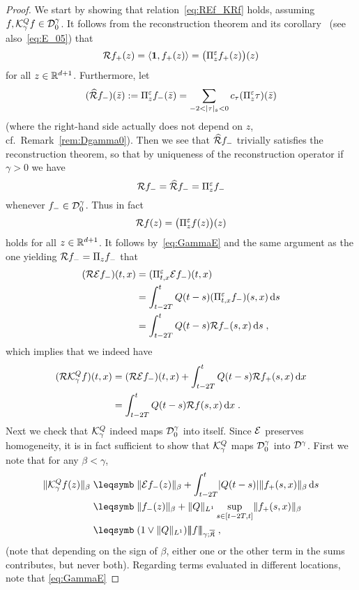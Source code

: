 \documentclass[reqno,11pt]{article}
\def\unit{\vone}
\def\normDgamma#1{|\!|\!|#1|\!|\!|}
\def\fraKbar{\overline{\mathfrak{K}}}
\def\abss#1{\abs{#1}_\mathfrak{s}}
\begin{document}
\begin{proof}
We start by showing that relation~\eqref{eq:REf_KRf} holds, assuming $f,
{\mathcal K}^Q_\gamma f\in{\mathcal D}^\gamma_0$. It follows from the reconstruction theorem and
its
corollary~\cite[Prop.~3.28]{Hairer2014} (see also~\eqref{eq:E_05}) that
\[
 \cR f_+(z) = \pscal{\unit}{f_+(z)} = \bigpar{\Pi^\eps_z f_+(z)}(z)
\]
for all $z\in\mathbb{R}^{d+1}$. Furthermore, let 
\[
 (\widehat\cR f_-)(\bar z) := \Pi^\eps_z f_-(\bar z) 
 =\sum_{-2<\abss{\tau}<0} c_\tau (\Pi^\eps_z\tau)(\bar z)
\]
(where the right-hand side actually does not depend on $z$, cf.\
Remark~\ref{rem:Dgamma0}). Then we see that $\widehat{{\mathcal R}} f_-$ trivially
satisfies the reconstruction theorem, so that by uniqueness of the
reconstruction operator if $\gamma>0$ we have 
\[
 {\mathcal R} f_- = \widehat{{\mathcal R}} f_- = \Pi^\varepsilon_z f_-
\]
whenever $f_-\in{\mathcal D}^\gamma_0$. Thus in fact 
\[
{\mathcal R} f(z) = \bigl(\Pi^\varepsilon_z f(z)\bigr)(z) 
\]
holds for all $z\in\mathbb{R}^{d+1}$. It follows by~\eqref{eq:GammaE} and the same
argument as the one yielding  ${\mathcal R} f_- = \Pi_z f_-$ that 
\begin{align*}
({\mathcal R}{\mathcal E} f_-)(t,x) 
&= (\Pi^\varepsilon_{t,x}{\mathcal E} f_-)(t,x) \\
&= \int_{t-2T}^t Q(t-s) (\Pi^\varepsilon_{t,x}f_-)(s,x)\operatorname{d}\!s \\
&= \int_{t-2T}^t Q(t-s) {\mathcal R} f_-(s,x)\operatorname{d}\!s\;,
\end{align*}
which implies that we indeed have  
\begin{align*}
 ({\mathcal R}{\mathcal K}^Q_\gamma f)(t,x) 
 &= ({\mathcal R}{\mathcal E} f_-)(t,x) + \int_{t-2T}^t Q(t-s){\mathcal R} f_+(s,x)\operatorname{d}\!x \\
 &= \int_{t-2T}^t Q(t-s){\mathcal R} f(s,x)\operatorname{d}\!x\;.
\end{align*}
Next we check that ${\mathcal K}^Q_\gamma$ indeed maps ${\mathcal D}^\gamma_0$ into itself. Since
${\mathcal E}$ preserves homogeneity, it is in fact sufficient to show that
${\mathcal K}^Q_\gamma$ maps ${\mathcal D}^\gamma_0$ into ${\mathcal D}^\gamma$. 
First we note that for any $\beta<\gamma$, 
\begin{align*}
\norm{\cK^Q_\gamma f(z)}_\beta 
&\leqs \norm{\cE f_-(z)}_\beta + \int_{t-2T}^t \abs{Q(t-s)}
\norm{f_+(s,x)}_\beta \6s \\
&\leqs \norm{f_-(z)}_\beta + \norm{Q}_{L^1} \sup_{s\in[t-2T,t]}
\norm{f_+(s,x)}_\beta \\
&\leqs (1 \vee \norm{Q}_{L^1}) \normDgamma{f}_{\gamma;\fraKbar}\;,
\end{align*}
(note that depending on the sign of $\beta$, either one or the other term in the
sums contributes, but never both). 
%
Regarding terms evaluated in different locations, note that \eqref{eq:GammaE}

\end{proof}
\end{document}
